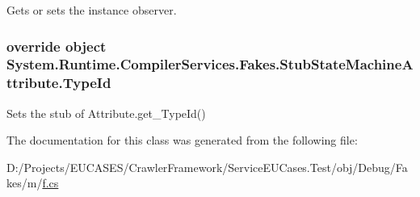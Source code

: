 Gets or sets the instance observer.

\hypertarget{class_system_1_1_runtime_1_1_compiler_services_1_1_fakes_1_1_stub_state_machine_attribute_a8c0efdb78a9c03c4c4f8ed8f88c867a0}{
\subsubsection[{Type\-Id}]{\setlength{\rightskip}{0pt plus 5cm}override object System.\-Runtime.\-Compiler\-Services.\-Fakes.\-Stub\-State\-Machine\-Attribute.\-Type\-Id\hspace{0.3cm}{\ttfamily [get]}}}\label{class_system_1_1_runtime_1_1_compiler_services_1_1_fakes_1_1_stub_state_machine_attribute_a8c0efdb78a9c03c4c4f8ed8f88c867a0}


Sets the stub of Attribute.\-get\-\_\-\-Type\-Id()



The documentation for this class was generated from the following file\-:\begin{DoxyCompactItemize}
\item 
D\-:/\-Projects/\-E\-U\-C\-A\-S\-E\-S/\-Crawler\-Framework/\-Service\-E\-U\-Cases.\-Test/obj/\-Debug/\-Fakes/m/\hyperlink{m_2f_8cs}{f.\-cs}\end{DoxyCompactItemize}
